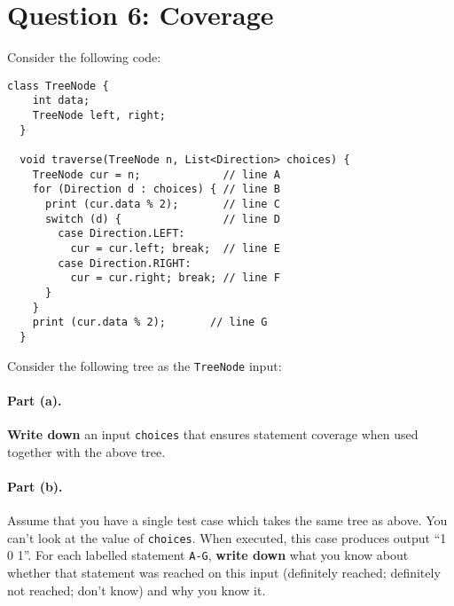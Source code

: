 \documentclass[12pt]{article}
\begin{document}
\section*{Question 6: Coverage}
Consider the following code:
\begin{lstlisting}[numbers=none]
  class TreeNode {
    int data;
    TreeNode left, right;
  }

  void traverse(TreeNode n, List<Direction> choices) {
    TreeNode cur = n;             // line A
    for (Direction d : choices) { // line B
      print (cur.data % 2);       // line C
      switch (d) {                // line D
        case Direction.LEFT:
          cur = cur.left; break;  // line E
        case Direction.RIGHT:
          cur = cur.right; break; // line F
      }
    }
    print (cur.data % 2);       // line G
  }
\end{lstlisting}
Consider the following tree as the {\tt TreeNode} input:
\begin{center}
\end{center}
\paragraph{Part (a).} {\bf Write down} an input {\tt choices} that ensures statement coverage when used
together with the above tree.

\paragraph{Part (b).} Assume that you have a single test case which takes the same tree as above.
You can't look at the value of \texttt{choices}. When executed, this case produces output ``1 0 1''.
For each labelled statement {\tt A-G}, {\bf write down} what you know about whether
that statement was reached on this input (definitely reached; definitely not reached;
don't know) and why you know it.
\end{document}
